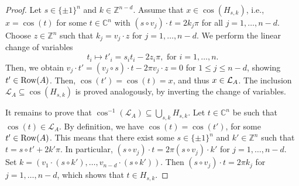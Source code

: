 \documentclass[a4paper, 11pt, twoside]{article}
\newcommand{\C}{\mathbb{C}}
\newcommand{\Row}{{\text{\rm Row}}}
\newcommand{\ML}{{\mathcal L}}
\newcommand{\Z}{\mathbb Z}
\theoremstyle{plain}
\begin{document}
\begin{proof}
Let $s\in\{\pm 1\}^n$ and $k\in \Z^{n-d}$. 
Assume that $x\in \cos(H_{s,k})$, i.e.,  $x=\cos (t)$  for some $t\in\C^n$ with $(s\circ v_j)\cdot t=2k_j\pi$ for all $j=1,\dotsc,n-d$. Choose $z\in\Z^n$ such that $k_j= v_j\cdot z$ for $j=1,\ldots,n-d$.
 We perform the linear change of variables 
\[
t_i  \mapsto t'_i= s_it_i -2z_i\pi,\text{ for } i=1,\dotsc, n.
\]
Then, we obtain $v_j\cdot t'= (v_j\circ s)\cdot t- 2\pi v_j\cdot z  = 0$ for $1\le j\le n-d$, showing $t'\in \Row (A)$. Then, $\cos(t')=\cos(t)=x$, and thus $x\in {\cal L}_A$.
The inclusion $\ML_A\subseteq \cos(H_{s,k})$ is proved analogously, by inverting the change of variables.

It remains to prove that  $\cos^{-1}(\ML_A) \subseteq \bigcup_{s,k} H_{s,k}$.
Let $t\in \C^n$ be such that $\cos(t)\in\ML_A$. 
By definition, we have $\cos(t)=\cos(t')$, for some $t' \in \Row(A)$. This means that there exist some $s\in \{\pm 1\}^n$ and $k'\in \Z^n$ such that $t=s\circ t'+2k'\pi$. 
In particular, $(s\circ v_j)\cdot t=2\pi (s\circ v_j)\cdot k'$ for $j=1,\dotsc,n-d$. Set $k=(v_1\cdot (s\circ k'),\dotsc,v_{n-d}\cdot (s\circ k'))$. Then
 $(s\circ v_j)\cdot t=2\pi k_j$ for $j=1,\dotsc,n-d$, which shows    that $t\in H_{s, k}$.
\end{proof}
\end{document}
